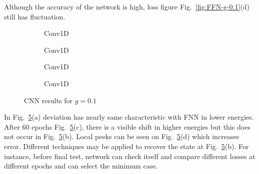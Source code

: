 \documentclass[a4paper,times,12pt]{article}
\begin{document}
Although the accuracy of the network is high, loss figure Fig.~\ref{fig:FFN-g-0.1}(d) still has fluctuation.

\begin{figure}[H]
    \centering
    \begin{subfigure}[t]{0.45\textwidth}
		\centering
        
        \caption{Conv1D}
		\label{fig:a}
    \end{subfigure}
    \begin{subfigure}[t]{0.45\textwidth}
		\centering
        
        \caption{Conv1D}
		\label{fig:b}
    \end{subfigure}    
    \begin{subfigure}[t]{0.45\textwidth}
        \centering
        
        \caption{Conv1D}
		\label{fig:c}
    \end{subfigure}
    \begin{subfigure}[t]{0.45\textwidth}
        \centering
        
        \caption{Conv1D}
		\label{fig:c}
    \end{subfigure}
	\caption{CNN results for $g = 0.1$}
\label{fig:CNN-g-0.1}
\end{figure}

In Fig.~\ref{fig:CNN-g-0.1}(a) deviation has nearly same characteristic with FNN in lower energies. After 60 epochs Fig.~\ref{fig:CNN-g-0.1}(c), there is a visible shift in higher energies but this does not occur in Fig.~\ref{fig:CNN-g-0.1}(b). Local peeks can be seen on Fig.~\ref{fig:CNN-g-0.1}(d) which increases error. Different techniques may be applied to recover the state at Fig.~\ref{fig:CNN-g-0.1}(b). For instance, before final test, network can check itself and compare different losses at different epochs and can select the minimum case. 
\end{document}
